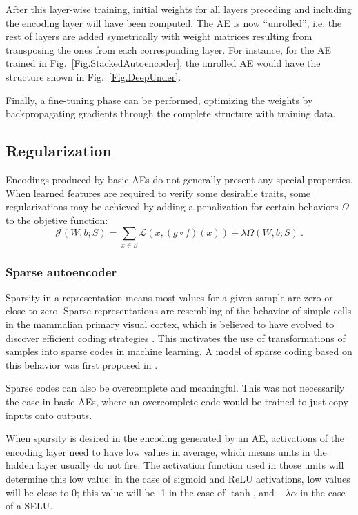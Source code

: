\documentclass[preprint,5p,compress]{elsarticle}
\begin{document}
After this layer-wise training, initial weights for all layers preceding and including the encoding layer will have been computed. The AE is now ``unrolled'', i.e. the rest of layers are added symetrically with weight matrices resulting from transposing the ones from each corresponding layer. For instance, for the AE trained in Fig.~\ref{Fig.StackedAutoencoder}, the unrolled AE would have the structure shown in Fig.~\ref{Fig.DeepUnder}.

Finally, a fine-tuning phase can be performed, optimizing the weights by backpropagating gradients through the complete structure with training data.



\subsection{Regularization}\label{Sec.Regularization}

Encodings produced by basic AEs do not generally present any special properties. When learned features are required to verify some desirable traits, some regularizations may be achieved by adding a penalization for certain behaviors $\Omega$ to the objetive function: 
\begin{equation}
  \mathcal J(W,b;S)=\sum_{x\in S} \mathcal L(x, (g\circ f)(x)) + \lambda\Omega(W,b;S)~.
\end{equation}

\subsubsection{Sparse autoencoder}\label{Sec.SparseAE}

Sparsity in a representation means most values for a given sample are zero or close to zero. Sparse representations are resembling of the behavior of simple cells in the mammalian primary visual cortex, which is believed to have evolved to discover efficient coding strategies \cite{olshausen1997sparse}. This motivates the use of transformations of samples into sparse codes in machine learning. A model of sparse coding based on this behavior was first proposed in \cite{olshausen1996emergence}.

Sparse codes can also be overcomplete and meaningful. This was not necessarily the case in basic AEs, where an overcomplete code would be trained to just copy inputs onto outputs.

When sparsity is desired in the encoding generated by an AE, activations of the encoding layer need to have low values in average, which means units in the hidden layer usually do not fire. The activation function used in those units will determine this low value: in the case of sigmoid and ReLU activations, low values will be close to 0; this value will be -1 in the case of $\tanh$, and $-\lambda\alpha$ in the case of a SELU. 
\end{document}
